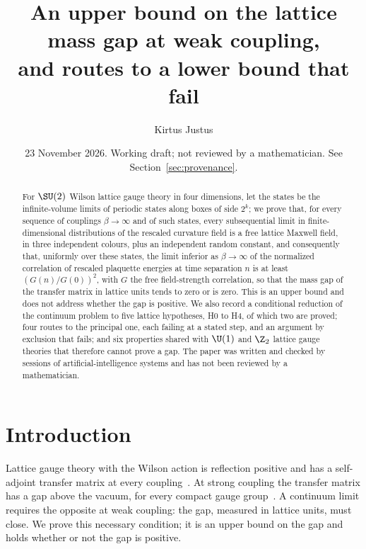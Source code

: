 
\title[An upper bound on the lattice mass gap at weak coupling]{An upper bound on the lattice mass gap at weak coupling,\\ and routes to a lower bound that fail}
\author{Kirtus Justus}
\address{Theoretical Physicist, Port Coquitlam, British Columbia, Canada}
\date{23 November 2026. Working draft; not reviewed by a mathematician. See Section~\ref{sec:provenance}.}

\begin{abstract}
For $\SU(2)$ Wilson lattice gauge theory in four dimensions, let the states be the infinite-volume limits of periodic states along boxes of side $2^k$; we prove that, for every sequence of couplings $\beta\to\infty$ and of such states, every subsequential limit in finite-dimensional distributions of the rescaled curvature field is a free lattice Maxwell field, in three independent colours, plus an independent random constant, and consequently that, uniformly over these states, the limit inferior as $\beta\to\infty$ of the normalized correlation of rescaled plaquette energies at time separation $n$ is at least $(G(n)/G(0))^2$, with $G$ the free field-strength correlation, so that the mass gap of the transfer matrix in lattice units tends to zero or is zero. This is an upper bound and does not address whether the gap is positive. We also record a conditional reduction of the continuum problem to five lattice hypotheses, H0 to H4, of which two are proved; four routes to the principal one, each failing at a stated step, and an argument by exclusion that fails; and six properties shared with $\U(1)$ and $\Z_2$ lattice gauge theories that therefore cannot prove a gap. The paper was written and checked by sessions of artificial-intelligence systems and has not been reviewed by a mathematician.
\end{abstract}
\maketitle
\tableofcontents

\section{Introduction}\label{sec:intro}

Lattice gauge theory with the Wilson action is reflection positive and has a self-adjoint transfer matrix at every coupling~\cite{OS78,Lu77}. At strong coupling the transfer matrix has a gap above the vacuum, for every compact gauge group~\cite{OS78}. A continuum limit requires the opposite at weak coupling: the gap, measured in lattice units, must close. We prove this necessary condition; it is an upper bound on the gap and holds whether or not the gap is positive.

